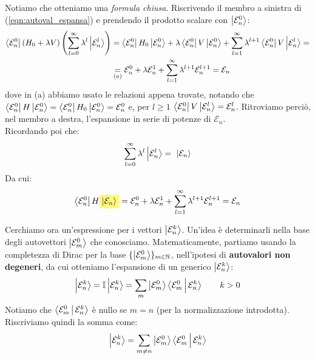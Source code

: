 \documentclass[../../FisicaTeorica.tex]{subfiles}
\begin{document}
Notiamo che otteniamo una \textit{formula chiusa}. Riscrivendo il membro a sinistra di (\ref{eqn:autoval_espansa}) e prendendo il prodotto scalare con $\Ket{\mathcal{E}_n^0}$:
\begin{align*}
\Bra{\mathcal{E}^0_n}(H_0 + \lambda V) \left( \sum_{l=0}^\infty \lambda^l \Ket{\mathcal{E}^l_n} \right) &= \Bra{\mathcal{E}_n^0}H_0\Ket{\mathcal{E}_n^0} + \lambda \Bra{\mathcal{E}_n^0} V \Ket{\mathcal{E}^0_n} + \sum_{l=1}^\infty \lambda^{l+1} \Bra{\mathcal{E}_n^0}V \Ket{\mathcal{E}_n^l} =\\
&\underset{(a)}{=}\mathcal{E}^0_n + \lambda \mathcal{E}^1_n + \sum_{l=1}^\infty \lambda^{l+1} \mathcal{E}^{l+1}_n = \mathcal{E}_n
\end{align*}
dove in (a) abbiamo usato le relazioni appena trovate, notando che $\Bra{\mathcal{E}_n^0}H\Ket{\mathcal{E}_n^0}=\Bra{\mathcal{E}_n^0}H_0\Ket{\mathcal{E}_n^0}=\mathcal{E}_n^0$ e, per $l\geq 1$ $\Bra{\mathcal{E}_n^0}V\Ket{\mathcal{E}_n^l}=\mathcal{E}_n^l$. Ritroviamo perciò, nel membro a destra, l'espansione in serie di potenze di $\mathcal{E}_n$.\\
Ricordando poi che:
\begin{align*}
\sum_{l=0}^\infty \lambda^l \Ket{\mathcal{E}^l_n} =\ \Ket{\mathcal{E}_n}
\end{align*}
Da cui:
\begin{align*}
\bra{\mathcal{E}_n^0}H\hlc{Yellow}{\ket{\mathcal{E}_n}} = \mathcal{E}_n^0 + \lambda\mathcal{E}_n^1 + \sum_{l=1}^\infty \lambda^{l+1}\mathcal{E}_n^{l+1}=\mathcal{E}_n
\end{align*}


Cerchiamo ora un'espressione per i vettori $\Ket{\mathcal{E}^k_n}$. Un'idea è determinarli nella base degli autovettori $\Ket{\mathcal{E}^0_m}$ che conosciamo. Matematicamente, partiamo usando la completezza di Dirac per la base $\{\Ket{\mathcal{E}^0_m}\}_{m\in \mathbb{N}}$, nell'ipotesi di \textbf{autovalori non degeneri}, da cui otteniamo l'espansione di un generico $\Ket{\mathcal{E}_n^k}$:
\begin{align*}
\Ket{\mathcal{E}_n^k} = \mathbb{I} \Ket{\mathcal{E}^k_n} = \sum_{m} \Ket{\mathcal{E}^0_m} \Braket{\mathcal{E}^0_m|\mathcal{E}^k_n} \qquad k>0
\end{align*}
Notiamo che $\Braket{\mathcal{E}^0_m|\mathcal{E}^k_n}$ è nullo se $m=n$ (per la normalizzazione introdotta). Riscriviamo quindi la somma come:
\begin{align*}
\Ket{\mathcal{E}_n^k} = \sum_{m\neq n} \Ket{\mathcal{E}^0_m} \Braket{\mathcal{E}_m^0| \mathcal{E}^k_n}
\end{align*}
\end{document}
